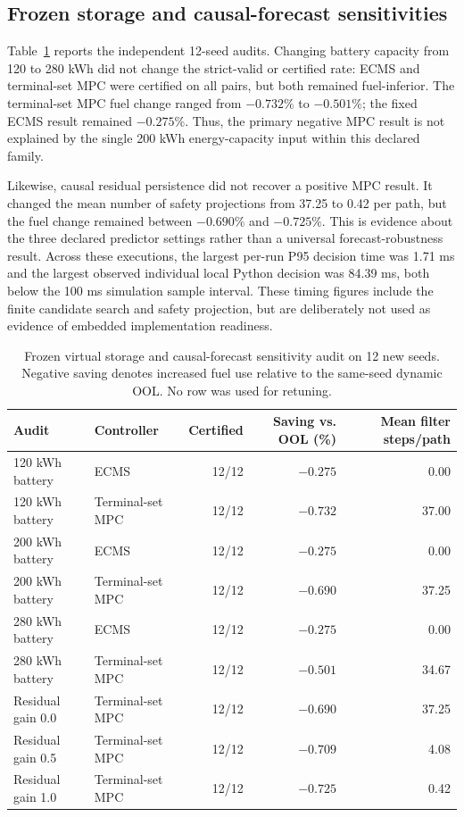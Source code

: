 \documentclass[energies,article,submit,moreauthors]{Definitions/mdpi}
\begin{document}
\subsection{Frozen storage and causal-forecast sensitivities}
Table~\ref{tab:store-forecast} reports the independent 12-seed audits. Changing battery capacity from 120 to 280 kWh did not change the strict-valid or certified rate: ECMS and terminal-set MPC were certified on all pairs, but both remained fuel-inferior. The terminal-set MPC fuel change ranged from $-0.732\%$ to $-0.501\%$; the fixed ECMS result remained $-0.275\%$. Thus, the primary negative MPC result is not explained by the single 200 kWh energy-capacity input within this declared family.

Likewise, causal residual persistence did not recover a positive MPC result. It changed the mean number of safety projections from 37.25 to 0.42 per path, but the fuel change remained between $-0.690\%$ and $-0.725\%$. This is evidence about the three declared predictor settings rather than a universal forecast-robustness result. Across these executions, the largest per-run P95 decision time was 1.71 ms and the largest observed individual local Python decision was 84.39 ms, both below the 100 ms simulation sample interval. These timing figures include the finite candidate search and safety projection, but are deliberately not used as evidence of embedded implementation readiness.

\begin{table}[H]
\centering
\caption{Frozen virtual storage and causal-forecast sensitivity audit on 12 new seeds. Negative saving denotes increased fuel use relative to the same-seed dynamic OOL. No row was used for retuning.}
\label{tab:store-forecast}
\scriptsize
\setlength{\tabcolsep}{3pt}
\begin{tabularx}{\linewidth}{@{}X l r r r@{}}
\toprule
Audit & Controller & Certified & Saving vs. OOL (\%) & Mean filter steps/path \\
\midrule
120 kWh battery & ECMS & 12/12 & $-0.275$ & 0.00 \\
120 kWh battery & Terminal-set MPC & 12/12 & $-0.732$ & 37.00 \\
200 kWh battery & ECMS & 12/12 & $-0.275$ & 0.00 \\
200 kWh battery & Terminal-set MPC & 12/12 & $-0.690$ & 37.25 \\
280 kWh battery & ECMS & 12/12 & $-0.275$ & 0.00 \\
280 kWh battery & Terminal-set MPC & 12/12 & $-0.501$ & 34.67 \\
Residual gain 0.0 & Terminal-set MPC & 12/12 & $-0.690$ & 37.25 \\
Residual gain 0.5 & Terminal-set MPC & 12/12 & $-0.709$ & 4.08 \\
Residual gain 1.0 & Terminal-set MPC & 12/12 & $-0.725$ & 0.42 \\
\bottomrule
\end{tabularx}
\end{table}
\end{document}
